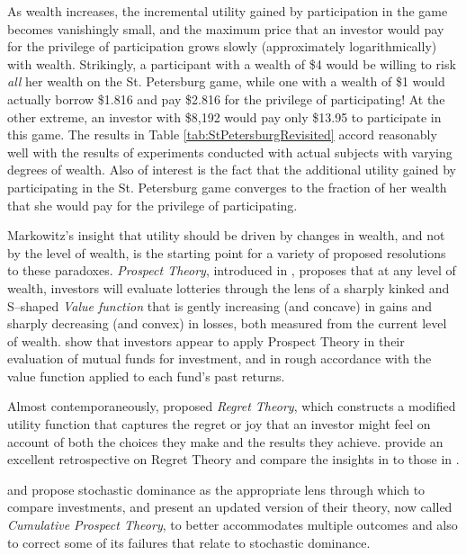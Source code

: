 \documentclass[graybox,envcountchap,sectrefs]{svmono}\usepackage[]{graphicx}\usepackage[]{xcolor}
\begin{document}
\begin{appendices}
\begin{table}[H]
\endgroup

\label{tab:StPetersburgRevisited}
\end{table}

As wealth increases, the incremental utility gained by participation
in the game becomes vanishingly small, and the maximum price that
an investor would pay for the privilege of participation grows slowly
(approximately logarithmically) with wealth. Strikingly, a participant
with a wealth of \$4 would be willing to risk \emph{all} her wealth
on the St. Petersburg game, while one with a wealth of \$1 would actually
borrow \$1.816 and pay \$2.816 for the privilege of participating!
At the other extreme, an investor with \$8,192 would pay only \$13.95
to participate in this game. The results in Table \ref{tab:StPetersburgRevisited}
accord reasonably well with the results of experiments conducted with
actual subjects with varying degrees of wealth. Also of interest is
the fact that the additional utility gained by participating in the
St. Petersburg game converges to the fraction of her wealth that she
would pay for the privilege of participating. 

Markowitz's insight that utility should be driven by changes in wealth,
and not by the level of wealth, is the starting point for a variety
of proposed resolutions to these paradoxes. \emph{Prospect Theory},
introduced in \citet{KahnemanTversky1979}, proposes that at any level
of wealth, investors will evaluate lotteries through the lens of a
sharply kinked and S--shaped \emph{Value function} that is gently
increasing (and concave) in gains and sharply decreasing (and convex)
in losses, both measured from the current level of wealth. \citet{HanSuiYang2026}
show that investors appear to apply Prospect Theory in their evaluation
of mutual funds for investment, and in rough accordance with the \citet{TverskyKahneman1992}
value function applied to each fund's past returns.

Almost contemporaneously, \citet{LoomesSudgen1982} proposed \emph{Regret
Theory}, which constructs a modified utility function that captures
the regret or joy that an investor might feel on account of both the
choices they make and the results they achieve. \citet{BleichrodtWakker2015}
provide an excellent retrospective on Regret Theory and compare the
insights in \citet{LoomesSudgen1982} to those in \citet{KahnemanTversky1979}. 

\citet{LevyKroll1976} and \citet{Levy2016} propose stochastic dominance
as the appropriate lens through which to compare investments, and
\citet{TverskyKahneman1992} present an updated version of their theory,
now called \emph{Cumulative Prospect Theory}, to better accommodates
multiple outcomes and also to correct some of its failures that relate
to stochastic dominance. 


\end{appendices}
\end{document}
